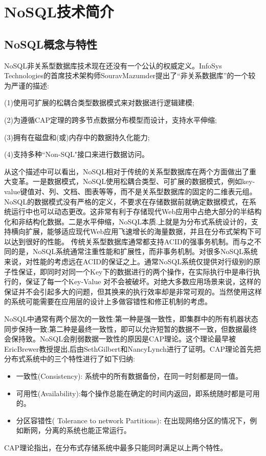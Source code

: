 \documentclass[11pt, a4paper, oneside]{ctexart}
\begin{document}
\section{NoSQL技术简介}
\subsection{NoSQL概念与特性}
NoSQL非关系型数据库技术现在还没有一个公认的权威定义。InfoSys Technologies的首席技术架构师SouravMazumder提出了“非关系数据库”的一个较为严谨的描述\textsuperscript{\cite{ref3}}:

(1)使用可扩展的松耦合类型数据模式来对数据进行逻辑建模;

(2)为遵循CAP定理的跨多节点数据分布模型而设计，支持水平伸缩;

(3)拥有在磁盘和(或)内存中的数据持久化能力;

(4)支持多种“Non-SQL"接口来进行数据访问。

从这个描述中可以看出，NoSQL相对于传统的关系型数据库在两个方面做出了重大变革。一是数据模式，NoSQL使用松耦合类型、可扩展的数据模式，例如key-value键值对、列、文档、图表等等，而不是关系型数据库的固定的二维表元组。NoSQL的数据模式没有严格的定义，不要求在存储数据前就确定数据模式，在系统运行中也可以动态更改。这非常有利于存储现代Web应用中占绝大部分的半结构化和非结构化数据。二是水平伸缩，NoSQL本质.上就是为分布式系统设计的，支持横向扩展，能够适应现代Web应用飞速增长的海量数据，并且在分布式架构下可以达到很好的性能。
传统关系型数据库通常都支持ACID的强事务机制。而与之不同的是，NoSQL系统通常注重性能和扩展性，而非事务机制。对很多NoSQL系统来说，对性能的考虑远在ACID的保证之上。通常NoSQL系统仅提供对行级别的原子性保证，即同时对同一个Key下的数据进行的两个操作，在实际执行中是串行执行的，保证了每一个Key-Value 对不会被破坏。对绝大多数应用场景来说，这样的保证并不会引起多大的问题，但其换来的执行效率却是非常可观的。当然使用这样的系统可能需要在应用层的设计上多做容错性和修正机制的考虑。

NoSQL中通常有两个层次的一致性:第一种是强一致性，即集群中的所有机器状态同步保持一致;第二种是最终一致性，即可以允许短暂的数据不一致，但数据最终会保持致。NoSQL会削弱数据一致性的原因是CAP理论。这个理论最早被EricBrewer教授提出,后由SethGilbert和NancyLynch进行了证明。CAP理论首先把分布式系统中的三个特性进行了如下归纳:
\begin{itemize}
    \item 一致性(Consistency): 系统中的所有数据备份，在同一时刻都是同一值。
    \item 可用性(Availability):每个操作总能在确定的时间内返回，即系统随时都是可用的。
    \item 分区容错性( Tolerance to network Partitions): 在出现网络分区的情况下，例如断网，分离的系统也能正常运行。
\end{itemize}
CAP理论指出，在分布式存储系统中最多只能同时满足以上两个特性\textsuperscript{\cite{ref4}}。
\end{document}
